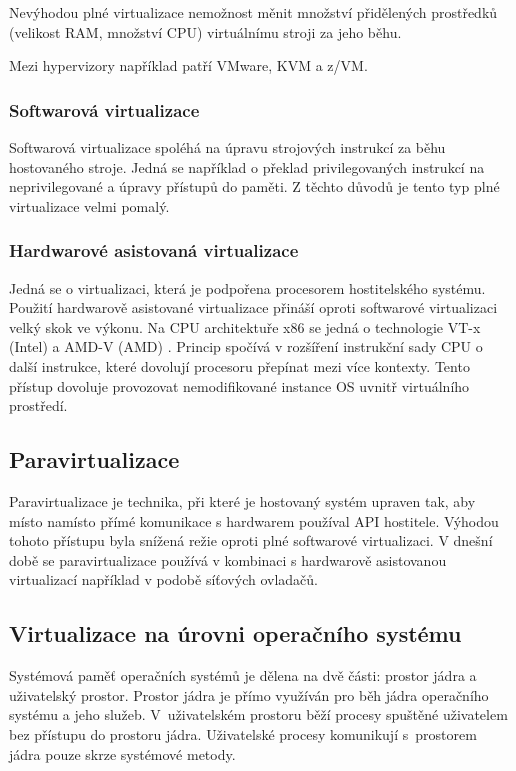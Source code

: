 Nevýhodou plné virtualizace nemožnost měnit množství přidělených prostředků (velikost RAM, množství CPU) virtuálnímu stroji za jeho běhu.

Mezi hypervizory například patří VMware, KVM a z/VM.

\subsubsection{Softwarová virtualizace}

Softwarová virtualizace spoléhá na úpravu strojových instrukcí za běhu hostovaného stroje.
Jedná se například o překlad privilegovaných instrukcí na neprivilegované a úpravy přístupů do paměti.
Z těchto důvodů je tento typ plné virtualizace velmi pomalý.

\subsubsection{Hardwarové asistovaná virtualizace}

Jedná se o virtualizaci, která je podpořena procesorem hostitelského systému.
Použití hardwarově asistované virtualizace přináší oproti softwarové virtualizaci velký skok ve výkonu.
Na CPU architektuře x86 se jedná o technologie VT-x (Intel) \cite{vt_x} a AMD-V (AMD) \cite{amd_v}.
Princip spočívá v rozšíření instrukční sady CPU o další instrukce, které dovolují procesoru přepínat mezi více kontexty.
Tento přístup dovoluje provozovat nemodifikované instance OS uvnitř virtuálního prostředí.

\subsection{Paravirtualizace}

Paravirtualizace je technika, při které je hostovaný systém upraven tak, aby místo namísto přímé komunikace s hardwarem používal API hostitele.
Výhodou tohoto přístupu byla snížená režie oproti plné softwarové virtualizaci.
V dnešní době se paravirtualizace používá v kombinaci s hardwarově asistovanou virtualizací například v podobě síťových ovladačů.


\subsection{Virtualizace na úrovni operačního systému}

Systémová paměť operačních systémů je dělena na dvě části: prostor jádra a uživatelský prostor.
Prostor jádra je přímo využíván pro běh jádra operačního systému a jeho služeb.
V~uživatelském prostoru běží procesy spuštěné uživatelem bez přístupu do prostoru jádra.
Uživatelské procesy komunikují s~prostorem jádra pouze skrze systémové metody.
\cite{kernel_space}

